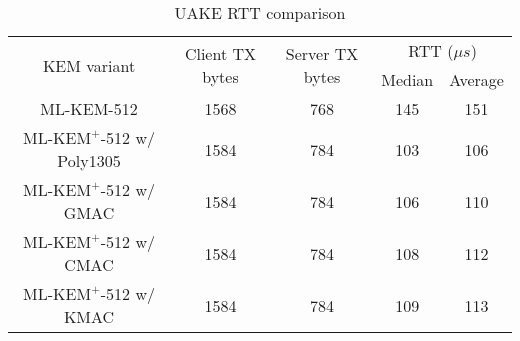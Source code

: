 \documentclass[journal=tches,submission]{iacrtrans}
\newcommand{\us}{\mu s}
\def\mlkemplus{\text{ML-KEM}^+}
\begin{document}
\begin{table}[h]
    \centering
    \footnotesize
    \caption{UAKE RTT comparison}\label{tbl:uake-rtt}
    \begin{tabular}{|c|c|c|c|c|}
        \hline
        \multirow{2}{*}{KEM variant}
        & \multirow{2}{*}{Client TX bytes}
        & \multirow{2}{*}{Server TX bytes}
        & \multicolumn{2}{|c|}{RTT ($\us$)} \\
        \cline{4-5}
        & & & Median & Average \\
        \hline
        ML-KEM-512 & 1568 & 768 & 145 & 151 \\
        \hline
        $\mlkemplus$-512 w/ Poly1305 & 1584 & 784 & 103 & 106 \\
        \hline
        $\mlkemplus$-512 w/ GMAC & 1584 & 784 & 106 & 110 \\
        \hline
        $\mlkemplus$-512 w/ CMAC & 1584 & 784 & 108 & 112 \\
        \hline
        $\mlkemplus$-512 w/ KMAC & 1584 & 784 & 109 & 113 \\
        \hline
    \end{tabular}\vspace{0.3cm}


\end{table}
\end{document}
